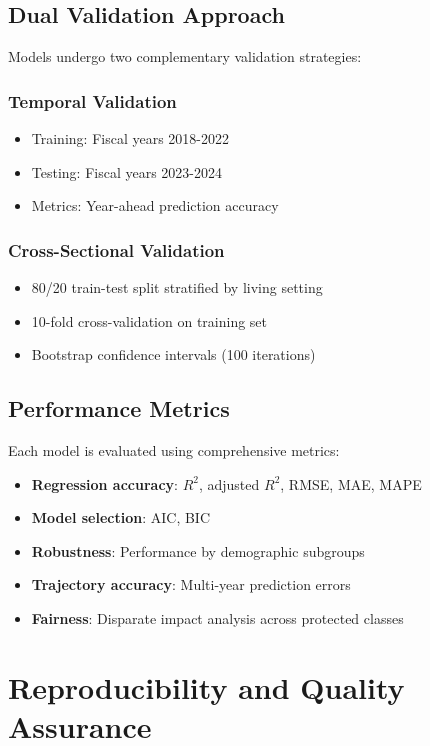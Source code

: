 \subsection{Dual Validation Approach}

Models undergo two complementary validation strategies:

\subsubsection{Temporal Validation}
\begin{itemize}
    \item Training: Fiscal years 2018-2022
    \item Testing: Fiscal years 2023-2024
    \item Metrics: Year-ahead prediction accuracy
\end{itemize}

\subsubsection{Cross-Sectional Validation}
\begin{itemize}
    \item 80/20 train-test split stratified by living setting
    \item 10-fold cross-validation on training set
    \item Bootstrap confidence intervals (100 iterations)
\end{itemize}

\subsection{Performance Metrics}

Each model is evaluated using comprehensive metrics:
\begin{itemize}
    \item \textbf{Regression accuracy}: $R^2$, adjusted $R^2$, RMSE, MAE, MAPE
    \item \textbf{Model selection}: AIC, BIC
    \item \textbf{Robustness}: Performance by demographic subgroups
    \item \textbf{Trajectory accuracy}: Multi-year prediction errors
    \item \textbf{Fairness}: Disparate impact analysis across protected classes
\end{itemize}

\section{Reproducibility and Quality Assurance}

